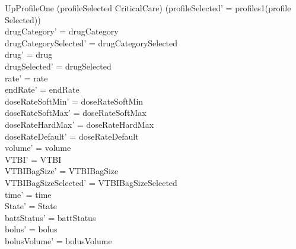\begin{schema}{UpProfileOne}
	(profileSelected \neq CriticalCare) \land (profileSelected' = profiles1(profile\\
	Selected))\\
	drugCategory' = drugCategory\\ 
	drugCategorySelected' = drugCategorySelected\\
	drug' = drug\\ 
	\pagebreak  
	drugSelected' = drugSelected\\
	rate' = rate\\
	endRate' = endRate\\
	doseRateSoftMin' = doseRateSoftMin\\
	doseRateSoftMax' = doseRateSoftMax\\
	doseRateHardMax' = doseRateHardMax\\
	doseRateDefault' = doseRateDefault\\
	volume' = volume\\
	VTBI' = VTBI\\
	VTBIBagSize' = VTBIBagSize\\ VTBIBagSizeSelected' = VTBIBagSizeSelected\\
	time' = time\\ State' = State\\
	battStatus' = battStatus\\
	bolus' = bolus\\
	bolusVolume' = bolusVolume\\

\end{schema}
